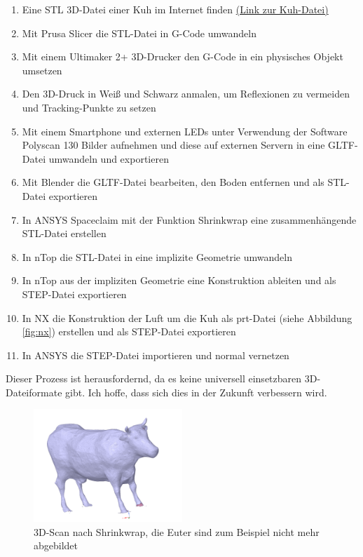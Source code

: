 \documentclass[a4paper,12pt]{article}
\begin{document}
\begin{enumerate}
\item Eine STL 3D-Datei einer Kuh im Internet finden \href{https://www.printables.com/de/model/175429-cow}{(Link zur Kuh-Datei)}
\item Mit Prusa Slicer die STL-Datei in G-Code umwandeln
\item Mit einem Ultimaker 2+ 3D-Drucker den G-Code in ein physisches Objekt umsetzen
\item Den 3D-Druck in Weiß und Schwarz anmalen, um Reflexionen zu vermeiden und Tracking-Punkte zu setzen
\item Mit einem Smartphone und externen LEDs unter Verwendung der Software Polyscan 130 Bilder aufnehmen und diese auf externen Servern in eine GLTF-Datei umwandeln und exportieren
\item Mit Blender die GLTF-Datei bearbeiten, den Boden entfernen und als STL-Datei exportieren
\item In ANSYS Spaceclaim mit der Funktion Shrinkwrap eine zusammenhängende STL-Datei erstellen
\item In nTop die STL-Datei in eine implizite Geometrie umwandeln
\item In nTop aus der impliziten Geometrie eine Konstruktion ableiten und als STEP-Datei exportieren
\item In NX die Konstruktion der Luft um die Kuh als prt-Datei (siehe Abbildung \ref{fig:nx}) erstellen und als STEP-Datei exportieren
\item In ANSYS die STEP-Datei importieren und normal vernetzen
\end{enumerate}

Dieser Prozess ist herausfordernd, da es keine universell einsetzbaren 3D-Dateiformate gibt. Ich hoffe, dass sich dies in der Zukunft verbessern wird.


\begin{figure}[h]
    \centering
    \includegraphics[width=0.5\textwidth]{cew.PNG}
    \caption{3D-Scan nach Shrinkwrap, die Euter sind zum Beispiel nicht mehr abgebildet}
    \label{fig:scangeometry}
\end{figure}
\end{document}
